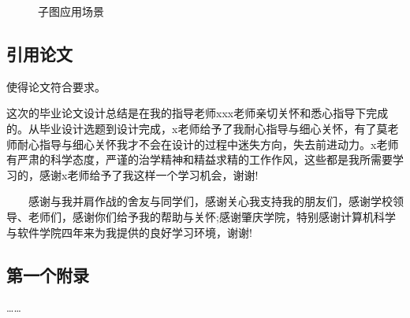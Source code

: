 \documentclass[bachelor,nocolorlinks, printoneside]{seuthesis} %
\begin{document}
\begin{Main}
\begin{figure}
\centering
{}
\caption{子图应用场景}
\end{figure}

\section{引用论文}
使得论文符合要求\cite{Yao:2015ix}\cite{seucover}\cite{test1}\cite{test}\cite{R1}。

\end{Main} %

\begin{Acknowledgement}{}
这次的毕业论文设计总结是在我的指导老师xxx老师亲切关怀和悉心指导下完成的。从毕业设计选题到设计完成，x老师给予了我耐心指导与细心关怀，有了莫老师耐心指导与细心关怀我才不会在设计的过程中迷失方向，失去前进动力。x老师有严肃的科学态度，严谨的治学精神和精益求精的工作作风，这些都是我所需要学习的，感谢x老师给予了我这样一个学习机会，谢谢!

　　感谢与我并肩作战的舍友与同学们，感谢关心我支持我的朋友们，感谢学校领导、老师们，感谢你们给予我的帮助与关怀;感谢肇庆学院，特别感谢计算机科学与软件学院四年来为我提供的良好学习环境，谢谢!
\end{Acknowledgement}


{}
\begin{Appendix}
  \chapter{第一个附录}
  ……
\end{Appendix}



\newpage
\printindex %



%
%
\end{document}
